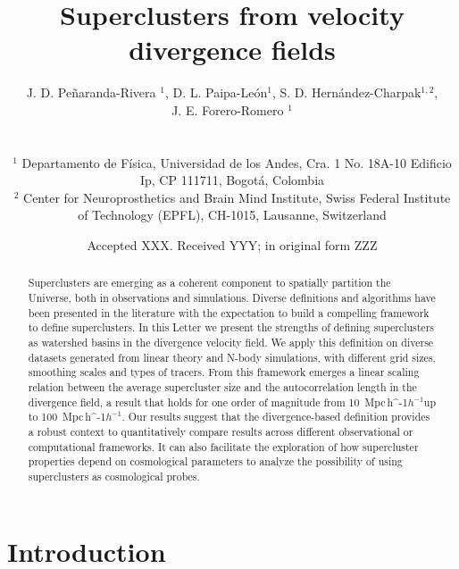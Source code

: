 \documentclass[usenatbib]{mnras}
\title[Superclusters from velocity divergence fields]{Superclusters from velocity divergence fields}
\author[Pe\~naranda-Rivera et al.]{
\parbox[t]{\textwidth}{
    {J. D. Pe\~naranda-Rivera $^1$,} 
    {D. L. Paipa-Le\'on$^{1}$,}
    {S. D. Hern\'andez-Charpak$^{1,2}$,}\\
    {J. E. Forero-Romero $^{1}$}
}
\\\\
$^{1}$ Departamento de F\'isica, Universidad de los Andes, Cra. 1
  No. 18A-10 Edificio Ip, CP 111711, Bogot\'a, Colombia \\
$^{2}$ Center for Neuroprosthetics and Brain Mind Institute, Swiss
  Federal Institute of Technology (EPFL), CH-1015, Lausanne,
  Switzerland\\  
}
\date{Accepted XXX. Received YYY; in original form ZZZ}
\newcommand{\Mpch}{\,{\rm Mpc}\,\ifmmode h^{-1}\else $h^{-1}$\fi}
\begin{document}
\label{firstpage}
\pagerange{\pageref{firstpage}--\pageref{lastpage}}
\maketitle

\maketitle
\begin{abstract}
Superclusters are emerging as a coherent component to spatially partition the Universe, both in observations and simulations.
Diverse definitions and algorithms have been presented in the literature with the expectation to build a compelling framework to define superclusters.
In this Letter we present the strengths of defining superclusters as watershed basins in the divergence velocity field.
We apply this definition on diverse datasets generated from linear theory and  N-body simulations, with different grid sizes, smoothing scales and types of tracers.
From this framework emerges a linear scaling relation between the average supercluster size and the autocorrelation length in the divergence field, a result that holds for one order of magnitude from 10 \Mpch up to 100 \Mpch.
Our results suggest that the divergence-based definition provides a robust context to quantitatively compare results across different observational or computational frameworks. It can also facilitate the exploration of how supercluster properties depend on cosmological parameters to analyze the possibility of using superclusters as cosmological probes.
\end{abstract}

\begin{keywords}
\end{keywords}




\section{Introduction}
\end{document}
